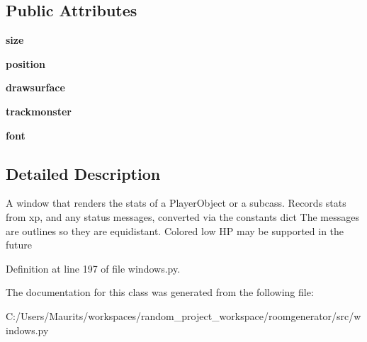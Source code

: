 \subsection*{Public Attributes}
\begin{DoxyCompactItemize}
\item 
\hypertarget{classwindows_1_1_stat_window_ab602832c51de7d46e84fc1a7be18b63d}{}{\bfseries size}\label{classwindows_1_1_stat_window_ab602832c51de7d46e84fc1a7be18b63d}

\item 
\hypertarget{classwindows_1_1_stat_window_aa34bd2e55460b95bb6c801072a8e8992}{}{\bfseries position}\label{classwindows_1_1_stat_window_aa34bd2e55460b95bb6c801072a8e8992}

\item 
\hypertarget{classwindows_1_1_stat_window_a0b7fdd64e78fb63e5899db45d0010f06}{}{\bfseries drawsurface}\label{classwindows_1_1_stat_window_a0b7fdd64e78fb63e5899db45d0010f06}

\item 
\hypertarget{classwindows_1_1_stat_window_a594342da108161a799f27884199c52b7}{}{\bfseries trackmonster}\label{classwindows_1_1_stat_window_a594342da108161a799f27884199c52b7}

\item 
\hypertarget{classwindows_1_1_stat_window_acdfeebcf6ea062c9063c412f56d9bf6b}{}{\bfseries font}\label{classwindows_1_1_stat_window_acdfeebcf6ea062c9063c412f56d9bf6b}

\end{DoxyCompactItemize}


\subsection{Detailed Description}
\begin{DoxyVerb}A window that renders the stats of a PlayerObject or a subcass. Records stats from xp, and any status messages, converted via the constants dict
The messages are outlines so they are equidistant. Colored low HP may be supported in the future\end{DoxyVerb}
 

Definition at line 197 of file windows.\+py.



The documentation for this class was generated from the following file\+:\begin{DoxyCompactItemize}
\item 
C\+:/\+Users/\+Maurits/workspaces/random\+\_\+project\+\_\+workspace/roomgenerator/src/windows.\+py\end{DoxyCompactItemize}
